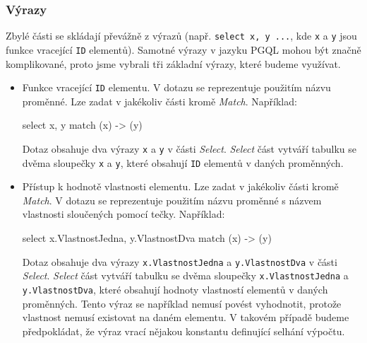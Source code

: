 \subsubsection{Výrazy}

Zbylé části se skládají převážně z výrazů (např. \texttt{select x, y ...}, kde \texttt{x} a \texttt{y} jsou funkce vracející \texttt{ID} elementů).
Samotné výrazy v jazyku PGQL mohou být značně komplikované, proto jsme vybrali tři základní výrazy, které budeme využívat.
\begin{itemize}

\item Funkce vracející \texttt{ID} elementu. 
V dotazu se reprezentuje použitím názvu proměnné.
Lze zadat v jakékoliv části kromě \textit{Match}.
Například:
\begin{code}
select x, y match (x) -> (y)
\end{code}
Dotaz obsahuje dva výrazy \texttt{x} a \texttt{y} v části \textit{Select}.
\textit{Select} část vytváří tabulku se dvěma sloupečky \texttt{x} a \texttt{y}, které obsahují \texttt{ID} elementů v daných proměnných.

\item 
Přístup k hodnotě vlastnosti elementu.
Lze zadat v jakékoliv části kromě \textit{Match}.
V dotazu se reprezentuje použitím názvu proměnné s názvem vlastnosti sloučených pomocí tečky.
Například: 
\begin{code}
select x.VlastnostJedna, y.VlastnostDva match (x) -> (y)
\end{code}
Dotaz obsahuje dva výrazy \texttt{x.VlastnostJedna} a \texttt{y.VlastnostDva} v části \textit{Select}.
\textit{Select} část vytváří tabulku se dvěma sloupečky \texttt{x.VlastnostJedna} a \texttt{y.VlastnostDva}, které obsahují hodnoty vlastností elementů v daných proměnných.
Tento výraz se například nemusí povést vyhodnotit, protože vlastnost nemusí existovat na daném elementu.
V takovém případě budeme předpokládat, že výraz vrací nějakou konstantu definující selhání výpočtu.


\end{itemize}
